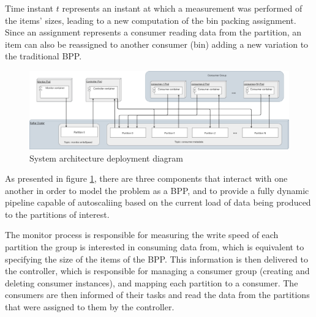 Time instant $t$ represents an instant at which a measurement was performed
of the items' sizes, leading to a new computation of the bin packing assignment.
Since an assignment represents a consumer reading data from the partition, an
item can also be reassigned to another consumer (bin) adding a new variation to the
traditional BPP. 

\begin{figure}[htb!] \centering
    \includegraphics[width=\textwidth]{images/controller/System Design.png}
    \caption{System architecture deployment diagram} 
    \label{fig:system_architecture}
\end{figure}

As presented in figure \ref{fig:system_architecture}, there are three components
that interact with one another in order to model the problem as a BPP, and to
provide a fully dynamic pipeline capable of autoscaliing based on the current
load of data being produced to the partitions of interest.

The monitor process is responsible for measuring the write speed of each
partition the group is interested in consuming data from, which is equivalent to
specifying the size of the items of the BPP.  This information is then delivered
to the controller, which is responsible for managing a consumer group (creating
and deleting consumer instances), and mapping each partition to a consumer. The
consumers are then informed of their tasks and read the data from the partitions
that were assigned to them by the controller.

